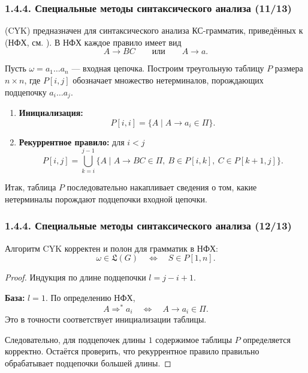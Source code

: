 \begin{frame}
\frametitle{1.4.4. Специальные методы синтаксического анализа (11/13)}

(CYK) предназначен для синтаксического анализа КС-грамматик, приведённых к
(НФХ, см. ). В НФХ каждое правило имеет вид
\[
A \to BC
\qquad \text{или} \qquad
A \to a.
\]

Пусть $\omega=a_1\dots a_n$ --- входная цепочка. Построим треугольную таблицу
$P$ размера $n\times n$, где $P[i,j]$ обозначает множество нетерминалов,
порождающих подцепочку $a_i\dots a_j$.

\begin{enumerate}
    \item \textbf{Инициализация:}
    \[
    P[i,i]=\{A \mid A \to a_i \in \Pi\}.
    \]

    \item \textbf{Рекуррентное правило:}
    для $i<j$
    \[
    P[i,j]=
    \bigcup_{k=i}^{j-1}
    \{A \mid A \to BC \in \Pi,\ B \in P[i,k],\ C \in P[k+1,j]\}.
    \]
\end{enumerate}

Итак, таблица $P$ последовательно накапливает сведения о том, какие нетерминалы
порождают подцепочки входной цепочки.
\end{frame}

\begin{frame}
\frametitle{1.4.4. Специальные методы синтаксического анализа (12/13)}

\begin{theorem}
Алгоритм CYK корректен и полон для грамматик в НФХ:
\[
\omega \in \mathfrak{L}(G)
\quad \Longleftrightarrow \quad
S \in P[1,n].
\]
\end{theorem}

\begin{proof}
Индукция по длине подцепочки $l=j-i+1$.

\textbf{База:} $l=1$. По определению НФХ,
\[
A \Rightarrow^* a_i
\quad \Longleftrightarrow \quad
A \to a_i \in \Pi.
\]
Это в точности соответствует инициализации таблицы.

Следовательно, для подцепочек длины $1$ содержимое таблицы $P$ определяется
корректно. Остаётся проверить, что рекуррентное правило правильно обрабатывает
подцепочки большей длины.
\end{proof}
\end{frame}

